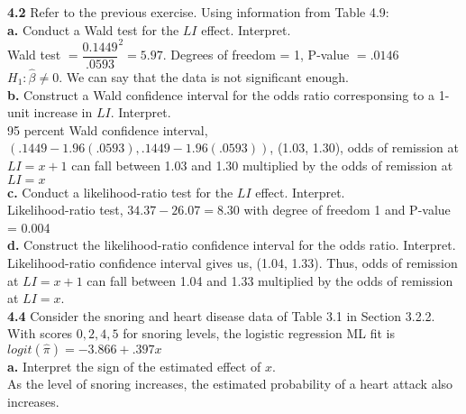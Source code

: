 \documentclass[paper=letter, fontsize=11pt]{scrartcl} %
\begin{document}
\textbf{4.2} Refer to the previous exercise. Using information from Table 4.9: \\

\textbf{a.} Conduct a Wald test for the $LI$ effect. Interpret. \\
Wald test $= \dfrac{0.1449}{.0593}^2 = 5.97$. Degrees of freedom = 1, P-value 
$= .0146$\\
$H_1: \hat{\beta} \not=0.$
We can say that the data is not significant enough.
\\

\textbf{b.} Construct a Wald confidence interval for the odds ratio corresponsing to a 
1-unit increase in $LI$. Interpret. \\
95 percent Wald confidence interval, $(.1449-1.96(.0593), .1449-1.96(.0593))$,
(1.03, 1.30), odds of remission at $LI = x + 1$ can fall between 1.03 and 1.30 
multiplied by the odds of remission at $LI = x$ \\

\textbf{c.} Conduct a likelihood-ratio test for the $LI$ effect. Interpret. \\
Likelihood-ratio test, $34.37 - 26.07 = 8.30$ with degree of freedom 1 and P-value = 0.004 \\

\textbf{d.} Construct the likelihood-ratio confidence interval for the odds ratio. 
Interpret. \\
Likelihood-ratio confidence interval gives us, (1.04, 1.33). Thus, odds of remission 
at $LI = x+1$ can fall between 1.04 and 1.33 multiplied by the odds of remission at 
$LI = x$.
\\

\textbf{4.4} Consider the snoring and heart disease data of Table 3.1 in Section 3.2.2. 
With scores ${0,2,4,5}$ for snoring levels, the logistic regression ML fit is 
$logit(\hat{\pi}) = -3.866 + .397x$ \\

\textbf{a.} Interpret the sign of the estimated effect of $x$. \\
As the level of snoring increases, the estimated probability of a heart attack also
increases.
\end{document}
